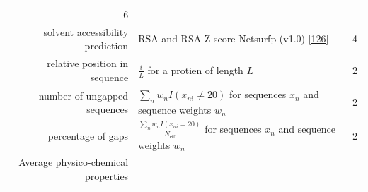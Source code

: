 \documentclass[12pt,a4paper,twoside]{book}
\theoremstyle{definition}
\theoremstyle{definition}
\theoremstyle{remark}
\begin{document}
\begin{longtable}[]{@{}rlc@{}}
\begin{minipage}[t]{0.18\columnwidth}
6\strut
\end{minipage}\tabularnewline
\begin{minipage}[t]{0.23\columnwidth}\raggedleft\strut
solvent accessibility prediction\strut
\end{minipage} & \begin{minipage}[t]{0.50\columnwidth}\raggedright\strut
RSA and RSA Z-score Netsurfp (v1.0)
{[}\protect\hyperlink{ref-Petersen2009a}{126}{]}\strut
\end{minipage} & \begin{minipage}[t]{0.18\columnwidth}\centering\strut
4\strut
\end{minipage}\tabularnewline
\begin{minipage}[t]{0.23\columnwidth}\raggedleft\strut
relative position in sequence\strut
\end{minipage} & \begin{minipage}[t]{0.50\columnwidth}\raggedright\strut
\(\frac{i}{L}\) for a protien of length \(L\)\strut
\end{minipage} & \begin{minipage}[t]{0.18\columnwidth}\centering\strut
2\strut
\end{minipage}\tabularnewline
\begin{minipage}[t]{0.23\columnwidth}\raggedleft\strut
number of ungapped sequences\strut
\end{minipage} & \begin{minipage}[t]{0.50\columnwidth}\raggedright\strut
\(\sum_n w_n I(x_{ni} \neq 20)\) for sequences \(x_n\) and sequence
weights \(w_n\)\strut
\end{minipage} & \begin{minipage}[t]{0.18\columnwidth}\centering\strut
2\strut
\end{minipage}\tabularnewline
\begin{minipage}[t]{0.23\columnwidth}\raggedleft\strut
percentage of gaps\strut
\end{minipage} & \begin{minipage}[t]{0.50\columnwidth}\raggedright\strut
\(\frac{\sum_n w_n I(x_{ni} = 20)}{N_{\text{eff}}}\) for sequences
\(x_n\) and sequence weights \(w_n\)\strut
\end{minipage} & \begin{minipage}[t]{0.18\columnwidth}\centering\strut
2\strut
\end{minipage}\tabularnewline
\begin{minipage}[t]{0.23\columnwidth}\raggedleft\strut
Average physico-chemical properties\strut

\end{minipage}
\end{longtable}
\end{document}
